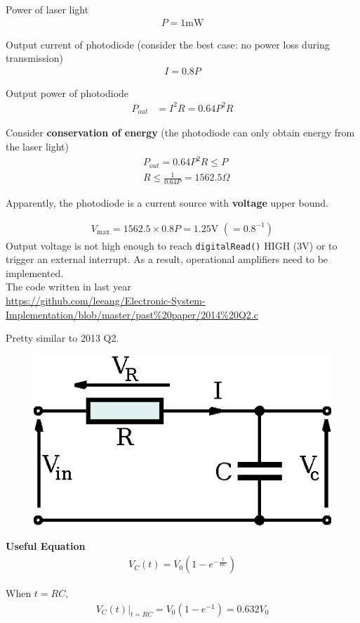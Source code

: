 Power of laser light
\begin{align*}
P = 1 \text{mW}
\end{align*}

Output current of photodiode (consider the best case: no power loss during transmission)
\begin{align*}
I = 0.8 P
\end{align*}

Output power of photodiode
\begin{align*}
P_{out} &= I^2 R = 0.64 P^2 R
\end{align*}

Consider \textbf{conservation of energy} (the photodiode can only obtain energy from the laser light)
\begin{align*}
&P_{out} = 0.64 P^2 R \le P\\
&R \le \frac{1}{0.64P} = 1562.5 \Omega
\end{align*}

Apparently, the photodiode is a current source with \textbf{voltage} upper bound.

\begin{align*}
V_{\max} = 1562.5 \times 0.8 P = 1.25 \text{V } (= 0.8^{-1})
\end{align*}
Output voltage is not high enough to reach \texttt{digitalRead()} HIGH (3V) or to trigger an external interrupt. As a result, operational amplifiers need to be implemented.\\

The code written in last year\\
\url{https://github.com/leeang/Electronic-System-Implementation/blob/master/past%20paper/2014%20Q2.c}

Pretty similar to 2013 Q2.

\begin{figure}[H]
\centering
\includegraphics[width=0.3\linewidth]{RC}
\end{figure}

\textbf{Useful Equation}
\begin{align*}
V_C(t) = V_0 (1 - e^{-\frac{t}{RC}})
\end{align*}

When $t = RC$,
\begin{align*}
V_C(t)|_{t=RC} = V_0 (1 - e^{-1}) = 0.632 V_0
\end{align*}

